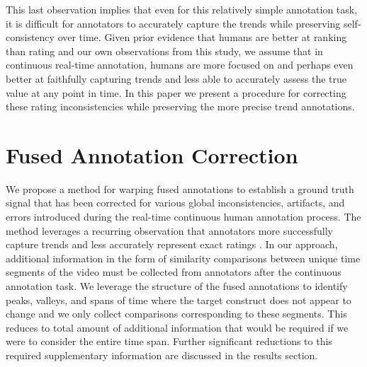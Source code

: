 \documentclass[10pt,letterpaper]{article}
\begin{document}
This last observation implies that even for this relatively simple annotation task, it is difficult for annotators to accurately capture the trends while preserving self-consistency over time.  Given prior evidence that humans are better at ranking than rating \cite{Yannakakis2011, metallinou2013annotation, yannakakis2015ratings} and our own observations from this study, we assume that in continuous real-time annotation, humans are more focused on and perhaps even better at faithfully capturing trends and less able to accurately assess the true value at any point in time.  In this paper we present a procedure for correcting these rating inconsistencies while preserving the more precise trend annotations.

\section*{Fused Annotation Correction}

We propose a method for warping fused annotations to establish a ground truth signal that has been corrected for various global inconsistencies, artifacts, and errors introduced during the real-time continuous human annotation process.  The method leverages a recurring observation that annotators more successfully capture trends and less accurately represent exact ratings \cite{Yannakakis2011, metallinou2013annotation, yannakakis2015ratings}.  In our approach, additional information in the form of similarity comparisons between unique time segments of the video must be collected from annotators after the continuous annotation task.  We leverage the structure of the fused annotations to identify peaks, valleys, and spans of time where the target construct does not appear to change and we only collect comparisons corresponding to these segments.  This reduces to total amount of additional information that would be required if we were to consider the entire time span.  Further significant reductions to this required supplementary information are discussed in the results section.
\end{document}
